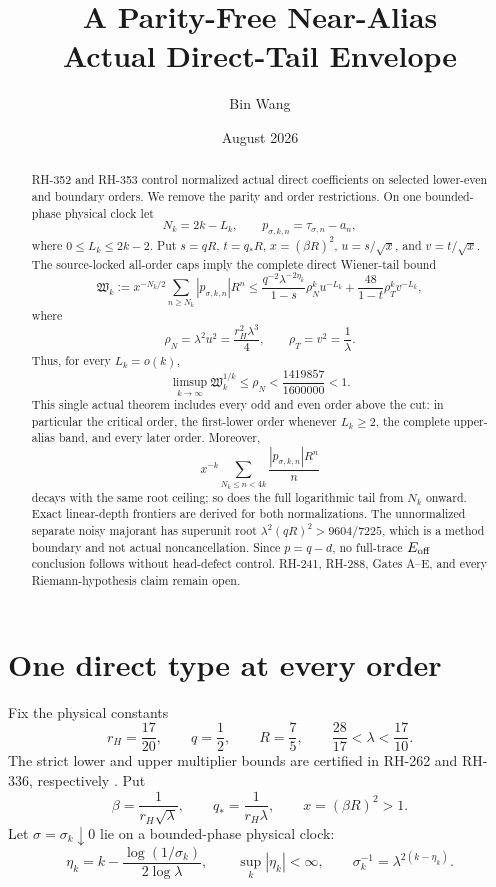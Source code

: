 \documentclass[11pt]{article}
\title{A Parity-Free Near-Alias\\Actual Direct-Tail Envelope}
\author{Bin Wang}
\date{August 2026}
\theoremstyle{remark}
\begin{document}
\maketitle

\begin{abstract}
RH-352 and RH-353 control normalized actual direct coefficients on selected
lower-even and boundary orders.  We remove the parity and order restrictions.
On one bounded-phase physical clock let
\[
 N_k=2k-L_k,\qquad p_{\sigma,k,n}=\tau_{\sigma,n}-a_n,
\]
where $0\le L_k\le2k-2$.  Put $s=qR$, $t=q_*R$,
$x=(\beta R)^2$, $u=s/\sqrt{x}$, and $v=t/\sqrt{x}$.  The source-locked
all-order caps imply the complete direct Wiener-tail bound
\[
 \mathfrak W_k:=x^{-N_k/2}\sum_{n\ge N_k}|p_{\sigma,k,n}|R^n
 \le
 \frac{q^{-2}\lambda^{-2\eta_k}}{1-s}\rho_N^ku^{-L_k}
 +\frac{48}{1-t}\rho_T^kv^{-L_k},
\]
where
\[
 \rho_N=\lambda^2u^2=\frac{r_H^2\lambda^3}{4},
 \qquad \rho_T=v^2=\frac1\lambda.
\]
Thus, for every $L_k=o(k)$,
\[
 \limsup_{k\to\infty}\mathfrak W_k^{1/k}
 \le\rho_N<\frac{1419857}{1600000}<1.
\]
This single actual theorem includes every odd and even order above the cut:
in particular the critical order, the first-lower order whenever $L_k\ge2$,
the complete upper-alias band, and every later order.  Moreover,
\[
 x^{-k}\sum_{N_k\le n<4k}
 \frac{|p_{\sigma,k,n}|R^n}{n}
\]
decays with the same root ceiling; so does the full logarithmic tail from
$N_k$ onward.  Exact linear-depth frontiers are derived for both
normalizations.  The unnormalized separate noisy majorant has superunit root
$\lambda^2(qR)^2>9604/7225$, which is a method boundary and not actual
noncancellation.  Since $p=q-d$, no full-trace $E_{\rm off}$ conclusion
follows without head-defect control.  RH-241, RH-288, Gates A--E, and every
Riemann-hypothesis claim remain open.
\end{abstract}

\section{One direct type at every order}

Fix the physical constants
\begin{equation}\label{eq:constants}
 r_H=\frac{17}{20},\qquad q=\frac12,\qquad R=\frac75,
 \qquad \frac{28}{17}<\lambda<\frac{17}{10}.
\end{equation}
The strict lower and upper multiplier bounds are certified in RH-262 and
RH-336, respectively
\citep{WangBoundaryBudget2026,WangProjectorMass2026}.  Put
\begin{equation}\label{eq:scales}
 \beta=\frac1{r_H\sqrt\lambda},\qquad
 q_*=\frac1{r_H\lambda},\qquad
 x=(\beta R)^2>1.
\end{equation}
Let $\sigma=\sigma_k\downarrow0$ lie on a bounded-phase physical clock:
\begin{equation}\label{eq:clock}
 \eta_k=k-\frac{\log(1/\sigma_k)}{2\log\lambda},
 \qquad \sup_k|\eta_k|<\infty,
 \qquad \sigma_k^{-1}=\lambda^{2(k-\eta_k)}.
\end{equation}
\end{document}
